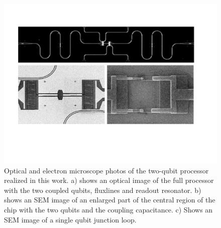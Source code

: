 \begin{figure}
	\includegraphics[width=\textwidth]{"./material/figures/2-qubit-processor/processor photos"}
	\caption{Optical and electron microscope photos of the two-qubit processor realized in this work. a) shows an optical image of the full processor with the two coupled qubits, fluxlines and readout resonator. b) shows an SEM image of an enlarged part of the central region of the chip with the two qubits and the coupling capacitance. c) Shows an SEM image of a single qubit junction loop.}
	\label{fig:qubit_chip_photos}
\end{figure}

